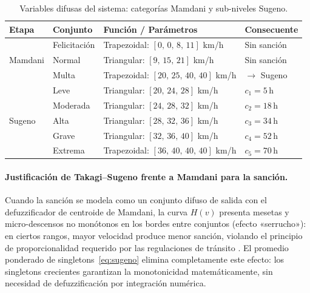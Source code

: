 \documentclass[11pt]{article}
\begin{document}
\begin{table}[H]
    \centering
    \footnotesize
    \caption{Variables difusas del sistema: categorías Mamdani y sub-niveles Sugeno.}
    \label{tab:fuzzy_vars}
    \renewcommand{\arraystretch}{1.25}
    \begin{tabular}{@{}l l p{4.8cm} p{3.8cm}@{}}
        \toprule
        \textbf{Etapa} & \textbf{Conjunto} & \textbf{Función / Parámetros} & \textbf{Consecuente} \\
        \midrule
        \multirow{3}{*}{Mamdani}
            & Felicitación & Trapezoidal: $[0,\,0,\,8,\,11]$ km/h    & Sin sanción \\
            & Normal       & Triangular:\phantom{xx} $[9,\,15,\,21]$ km/h & Sin sanción \\
            & Multa        & Trapezoidal: $[20,\,25,\,40,\,40]$ km/h & $\rightarrow$ Sugeno \\
        \midrule
        \multirow{5}{*}{Sugeno}
            & Leve     & Triangular: $[20,\,24,\,28]$ km/h & $c_1 = 5$\,h \\
            & Moderada & Triangular: $[24,\,28,\,32]$ km/h & $c_2 = 18$\,h \\
            & Alta     & Triangular: $[28,\,32,\,36]$ km/h & $c_3 = 34$\,h \\
            & Grave    & Triangular: $[32,\,36,\,40]$ km/h & $c_4 = 52$\,h \\
            & Extrema  & Trapezoidal: $[36,\,40,\,40,\,40]$ km/h & $c_5 = 70$\,h \\
        \bottomrule
    \end{tabular}
\end{table}

\paragraph{Justificación de Takagi--Sugeno frente a Mamdani para la sanción.}
Cuando la sanción se modela como un conjunto difuso de salida con el defuzzificador de
centroide de Mamdani, la curva $H(v)$ presenta mesetas y micro-descensos no monótonos
en los bordes entre conjuntos (efecto «serrucho»): en ciertos rangos, mayor velocidad
produce menor sanción, violando el principio de proporcionalidad requerido por las
regulaciones de tránsito \cite{reglamento}. El promedio ponderado de
singletons~\eqref{eq:sugeno} elimina completamente este efecto: los singletons
crecientes garantizan la monotonicidad matemáticamente, sin necesidad de
defuzzificación por integración numérica.
\end{document}
